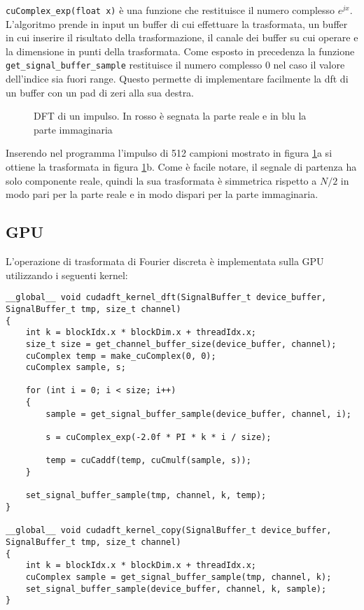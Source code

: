 \lstinline{cuComplex_exp(float x)} è una funzione che restituisce il numero complesso $e^{jx}$. L'algoritmo prende in input un buffer di cui effettuare la trasformata, un buffer in cui inserire il risultato della trasformazione, il canale dei buffer su cui operare e la dimensione in punti della trasformata. Come esposto in precedenza la funzione \lstinline{get_signal_buffer_sample} restituisce il numero complesso $0$ nel caso il valore dell'indice sia fuori range. Questo permette di implementare facilmente la dft di un buffer con un pad di zeri alla sua destra.

\begin{figure}[h]
    \centering
    \caption{DFT di un impulso. In rosso è segnata la parte reale e in blu la parte immaginaria}
    \label{fig:pulse512}
\end{figure}

Inserendo nel programma l'impulso di 512 campioni mostrato in figura \ref{fig:pulse512}a si ottiene la trasformata in figura \ref{fig:pulse512}b. Come è facile notare, il segnale di partenza ha solo componente reale, quindi la sua trasformata è simmetrica rispetto a $N/2$ in modo pari per la parte reale e in modo dispari per la parte immaginaria.

\subsection{GPU}
L'operazione di trasformata di Fourier discreta è implementata sulla GPU utilizzando i seguenti kernel:

\begin{lstlisting}
__global__ void cudadft_kernel_dft(SignalBuffer_t device_buffer, SignalBuffer_t tmp, size_t channel)
{
    int k = blockIdx.x * blockDim.x + threadIdx.x;
    size_t size = get_channel_buffer_size(device_buffer, channel);
    cuComplex temp = make_cuComplex(0, 0);
    cuComplex sample, s;
    
    for (int i = 0; i < size; i++)
    {
        sample = get_signal_buffer_sample(device_buffer, channel, i);

        s = cuComplex_exp(-2.0f * PI * k * i / size);

        temp = cuCaddf(temp, cuCmulf(sample, s));
    }
    
    set_signal_buffer_sample(tmp, channel, k, temp);
}

__global__ void cudadft_kernel_copy(SignalBuffer_t device_buffer, SignalBuffer_t tmp, size_t channel)
{
    int k = blockIdx.x * blockDim.x + threadIdx.x;
    cuComplex sample = get_signal_buffer_sample(tmp, channel, k);
    set_signal_buffer_sample(device_buffer, channel, k, sample);
}
\end{lstlisting}

